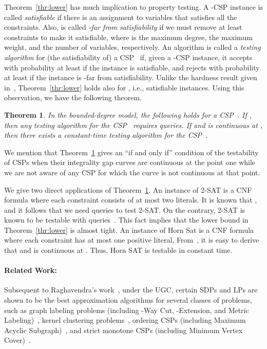 \documentclass[letterpaper, 11pt]{article}
\newtheorem{theorem}{Theorem}[section]
\begin{document}
Theorem~\ref{thr:lower} has much implication to property testing.
A -CSP instance  is called \textit{satisfiable} if there is an assignment to variables that satisfies all the constraints.
Also,  is called \textit{-far from satisfiability} if we must remove at least  constraints to make it satisfiable,
where  is the maximum degree, the maximum weight, and the number of variables, respectively.
An algorithm is called a \textit{testing algorithm} for (the satisfiability of) a CSP~ if,
given a -CSP instance,
it accepts with probability at least  if the instance is satisfiable,
and rejects with probability at least  if the instance is -far from satisfiability.
Unlike the hardness result given in~\cite{Rag08}, 
Theorem~\ref{thr:lower} holds also for ,
i.e., satisfiable instances.
Using this observation, we have the following theorem.
\begin{theorem}\label{thr:prop}
  In the bounded-degree model, the following holds for a CSP~.
  If , then any testing algorithm for the CSP~ requires  queries.
  If  and  is continuous at ,
  then there exists a constant-time testing algorithm for the CSP~.
\end{theorem}
We mention that Theorem~\ref{thr:prop} gives an ``if and only if'' condition of the testability of CSPs when their integrality gap curves are continuous at the point one
while we are not aware of any CSP for which the curve is not continuous at that point.

We give two direct applications of Theorem~\ref{thr:prop}.
An instance of \textsf{2-SAT} is a CNF formula where each constraint consists of at most two literals.
It is known that , and it follows that we need  queries to test \textsf{2-SAT}.
On the contrary, \textsf{2-SAT} is known to be testable with  queries~\cite{GR99}.
This fact implies that the lower bound in Theorem~\ref{thr:lower} is almost tight.
An instance of \textsf{Horn Sat} is a CNF formula where each constraint has at most one positive literal,
From~\cite{Zwi98}, it is easy to derive that  and  is continuous at .
Thus, \textsf{Horn SAT} is testable in constant time.

\vspace{-10pt}
\paragraph{Related Work:}
Subsequent to Raghavendra's work~\cite{Rag08},
under the UGC,
certain SDPs and LPs are shown to be the best approximation algorithms for several classes of problems,
such as 
graph labeling problems (including \textsf{-Way Cut}, \textsf{-Extension}, and \textsf{Metric Labeling})~\cite{MTRS08},
kernel clustering problems~\cite{KN09},
ordering CSPs (including \textsf{Maximum Acyclic Subgraph})~\cite{GMR08}, 
and strict monotone CSPs (including \textsf{Minimum Vertex Cover})~\cite{KMTV09}.
\end{document}
